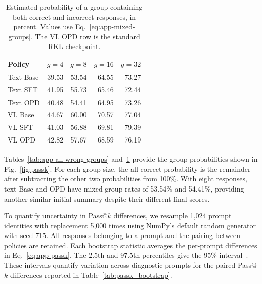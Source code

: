 \documentclass[]{jingdong}
\theoremstyle{plain}
\theoremstyle{definition}
\theoremstyle{remark}
\begin{document}
\begin{table}[H]
\centering
\small
\caption{Estimated probability of a group containing both correct and incorrect responses, in percent. Values use Eq.~\ref{eq:app-mixed-groups}. The VL OPD row is the standard RKL checkpoint.}
\label{tab:app-mixed-groups}
\setlength{\tabcolsep}{3pt}
\begin{tabular*}{\linewidth}{@{\extracolsep{\fill}}lrrrr@{}}
\toprule
Policy & $g=4$ & $g=8$ & $g=16$ & $g=32$ \\
\midrule
Text Base & 39.53 & 53.54 & 64.55 & 73.27 \\
Text SFT & 41.95 & 55.73 & 65.46 & 72.44 \\
Text OPD & 40.48 & 54.41 & 64.95 & 73.26 \\
VL Base & 44.67 & 60.00 & 70.57 & 77.04 \\
VL SFT & 41.03 & 56.88 & 69.81 & 79.39 \\
VL OPD & 42.82 & 57.67 & 68.59 & 76.19 \\
\bottomrule
\end{tabular*}
\end{table}


Tables~\ref{tab:app-all-wrong-groups} and~\ref{tab:app-mixed-groups} provide the group probabilities shown in Fig.~\ref{fig:passk}. For each group size, the all-correct probability is the remainder after subtracting the other two probabilities from 100\%. With eight responses, text Base and OPD have mixed-group rates of 53.54\% and 54.41\%, providing another similar initial summary despite their different final scores.

To quantify uncertainty in Pass@$k$ differences, we resample 1,024 prompt identities with replacement 5,000 times using NumPy's default random generator with seed 715. All responses belonging to a prompt and the pairing between policies are retained. Each bootstrap statistic averages the per-prompt differences in Eq.~\ref{eq:app-passk}. The 2.5th and 97.5th percentiles give the 95\% interval~\citep{efron1979bootstrap}. These intervals quantify variation across diagnostic prompts for the paired Pass@$k$ differences reported in Table~\ref{tab:passk_bootstrap}.
\end{document}
